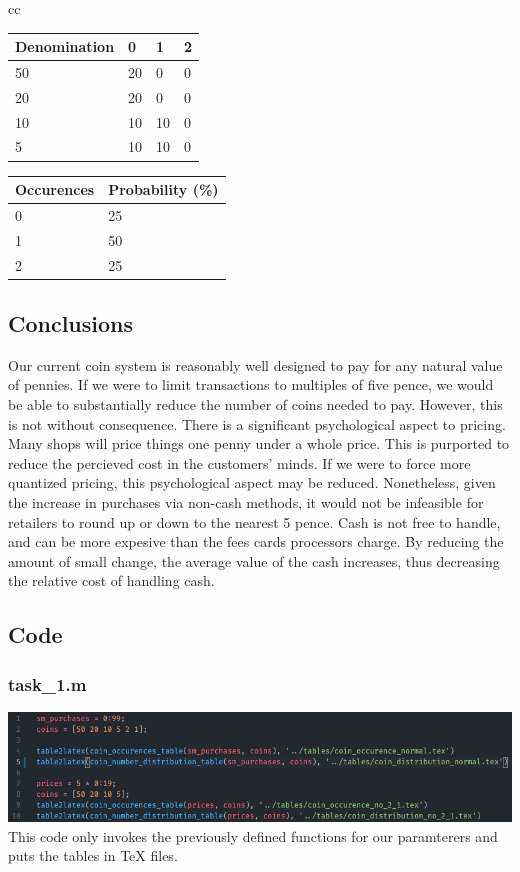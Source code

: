 \documentclass{article}
\begin{document}
\begin{tabular}{cc}
    \begin{tabular}[t]{llll}
        Denomination & 0  & 1  & 2 \\
        \hline
        50           & 20 & 0  & 0 \\
        20           & 20 & 0  & 0 \\
        10           & 10 & 10 & 0 \\
        5            & 10 & 10 & 0 \\
        \hline
    \end{tabular}
    \: \: \:
    \begin{tabular}[t]{ll}
        Occurences & Probability (\%) \\
        \hline
        0          & 25               \\
        1          & 50               \\
        2          & 25               \\
        \hline
    \end{tabular}
\end{tabular}

\subsection{Conclusions}
Our current coin system is reasonably well designed to pay for any natural value of pennies.
If we were to limit transactions to multiples of five pence, we would be able to substantially reduce the number of coins needed to pay.
However, this is not without consequence.
There is a significant psychological aspect to pricing.
Many shops will price things one penny under a whole price.
This is purported to reduce the percieved cost in the customers' minds.
If we were to force more quantized pricing, this psychological aspect may be reduced.
Nonetheless, given the increase in purchases via non-cash methods, it would not be infeasible for retailers to round up or down to the nearest 5 pence.
Cash is not free to handle, and can be more expesive than the fees cards processors charge.
By reducing the amount of small change, the average value of the cash increases, thus decreasing the relative cost of handling cash.
\newpage
\subsection{Code}
\subsubsection{task\_1.m}
\includegraphics[width=\textwidth]{task_1/task_1.m.png}
\\
This code only invokes the previously defined functions for our paramterers and puts the tables in TeX files.
\end{document}
